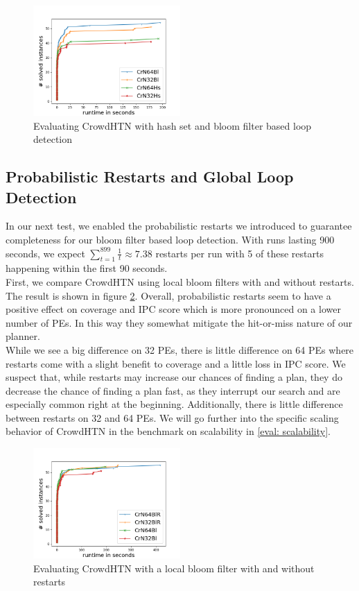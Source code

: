 \begin{figure}[!hbp]
	\caption{Evaluating CrowdHTN with hash set and bloom filter based loop detection}
	\label{figure: eval loop detection}
	
		\centering
		\includegraphics[width=0.5\textwidth]{images/final/loop_detection}
\end{figure}

\subsection{Probabilistic Restarts and Global Loop Detection}
\label{eval: restarts}
In our next test, we enabled the probabilistic restarts we introduced to guarantee completeness for our bloom filter based loop detection. With runs lasting 900 seconds, we expect $\sum_{t=1}^{899} \frac{1}{t} \approx 7.38$ restarts per run with 5 of these restarts happening within the first 90 seconds. \\
First, we compare CrowdHTN using local bloom filters with and without restarts. The result is shown in figure \ref{figure: restarts}. Overall, probabilistic restarts seem to have a positive effect on coverage and IPC score which is more pronounced on a lower number of PEs. In this way they somewhat mitigate the hit-or-miss nature of our planner. \\
While we see a big difference on 32 PEs, there is little difference on 64 PEs where restarts come with a slight benefit to coverage and a little loss in IPC score. We suspect that, while restarts may increase our chances of finding a plan, they do decrease the chance of finding a plan fast, as they interrupt our search and are especially common right at the beginning. Additionally, there is little difference between restarts on 32 and 64 PEs. We will go further into the specific scaling behavior of CrowdHTN in the benchmark on scalability in \ref{eval: scalability}. \\
\begin{figure}[!hbp]
	\caption{Evaluating CrowdHTN with a local bloom filter with and without restarts}
	\label{figure: restarts}
	\centering
	\includegraphics[width=0.5\textwidth]{images/final/restarts}
\end{figure}

